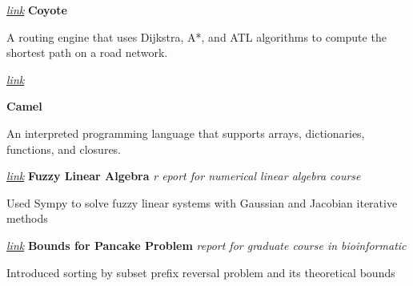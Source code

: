 \begin{twocolentry}{
		\textit{\href{https://github.com/mehrdad3301/coyote}{link}}}
	\textbf{Coyote}
\end{twocolentry}

\begin{onecolentry}
	A routing engine that uses Dijkstra, A*, and ATL algorithms to compute the shortest path on a road network.  
\end{onecolentry}

\vspace{0.2 cm}

\begin{twocolentry}{
		
		
		\textit{\href{https://github.com/camel-lang/interpreter}{link}}}
	\textbf{Camel}
\end{twocolentry}

\begin{onecolentry}
	An interpreted programming language that supports arrays, dictionaries, functions, and closures.  
\end{onecolentry}

\vspace{0.2 cm}
\begin{twocolentry}{
		\textit{\textit{\href{https://github.com/mehrdad3301/fuzzy-linear-algebra/blob/main/main.pdf}{link}}}}
	\textbf{Fuzzy Linear Algebra}
	\textit{r	eport for numerical linear algebra course}
\end{twocolentry}

\begin{onecolentry}
	Used Sympy to solve fuzzy linear systems with Gaussian and Jacobian iterative methods 
\end{onecolentry}

\vspace{0.2 cm}
\begin{twocolentry}{
		\textit{\href{https://github.com/mehrdad3301/pancake-bounds/blob/main/pancakes.pdf}{link}}}
		\textbf{Bounds for Pancake Problem} \textit{report for graduate course in bioinformatic}
\end{twocolentry}
	
\begin{onecolentry}
	Introduced sorting by subset prefix reversal problem and its theoretical bounds
\end{onecolentry}
